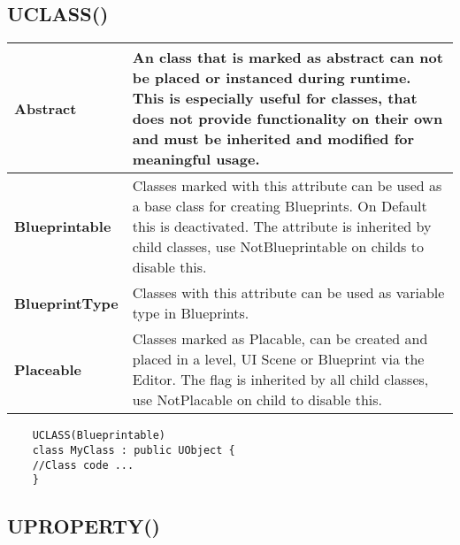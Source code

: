 \documentclass[10pt,a4paper]{article}
\begin{document}
\begin{multicols*}{2}
	\subsection{UCLASS()}
	\begin{tabularx}{\columnwidth}{|l|X|}
		\hline \textbf{Abstract}
		& An class that is marked as abstract can not be placed or instanced during runtime. This is especially useful for classes, that does not provide functionality on their own and must be inherited and modified for meaningful usage.\\
		\hline \textbf{Blueprintable}
		& Classes marked with this attribute can be used as a base class for creating Blueprints. On Default this is deactivated. The attribute is inherited by child classes, use NotBlueprintable on childs to disable this. \\
		\hline \textbf{BlueprintType}
		& Classes with this attribute can be used as variable type in Blueprints. \\
		\hline \textbf{Placeable}
		& Classes marked as Placable, can be created and placed in a level, UI Scene or Blueprint via the Editor. The flag is inherited by all child classes, use NotPlacable on child to disable this. \\
		\hline
	\end{tabularx}
	
	\begin{verbatim}
	UCLASS(Blueprintable)
	class MyClass : public UObject {
	//Class code ...
	}
	\end{verbatim}
	
	\subsection{UPROPERTY()}
	
	\begin{tabularx}{\columnwidth}{|p{3.5cm}|X|}
		

\end{tabularx}
\end{multicols*}
\end{document}
